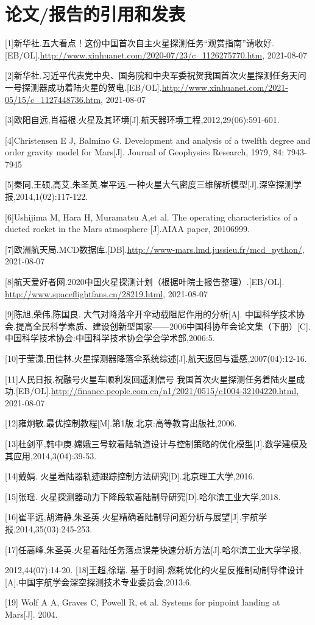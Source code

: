 \documentclass[UTF8,12pt]{ctexart}
\begin{document}
\section{论文/报告的引用和发表}
	\begin{flushleft}
		\fontsize{10.0pt}{0}
		[1]\enspace 新华社.五大看点！这份中国首次自主火星探测任务“观赏指南”请收好.[EB/OL].\url{http://www.xinhuanet.com/2020-07/23/c_1126275770.htm}, 2021-08-07
		
		[2]\enspace 新华社.习近平代表党中央、国务院和中央军委祝贺我国首次火星探测任务天问一号探测器成功着陆火星的贺电.[EB/OL].\url{http://www.xinhuanet.com/2021-05/15/c\_1127448736.htm}, 2021-08-07
		
		[3]\enspace 欧阳自远,肖福根.火星及其环境[J].航天器环境工程,2012,29(06):591-601.
		
		[4]\enspace Christensen E J, Balmino G. Development and analysis of a twelfth degree and order gravity model for Mars[J]. Journal of Geophysics Research, 1979, 84: 7943-7945
		
		[5]\enspace 秦同,王硕,高艾,朱圣英,崔平远.一种火星大气密度三维解析模型[J].深空探测学报,2014,1(02):117-122.
		
		[6]\enspace Ushijima M,  Hara H,  Muramatsu A,et al. The operating characteristics of a ducted rocket in the Mars atmosphere [J].AIAA paper, 20106999.
		
		[7]\enspace 欧洲航天局.MCD数据库.[DB].\url{http://www-mars.lmd.jussieu.fr/mcd_python/}, 2021-08-07
		
		[8]\enspace 航天爱好者网.2020中国火星探测计划（根据叶院士报告整理）.[EB/OL]. \url{http://www.spaceflightfans.cn/28219.html}, 2021-08-07
		
		[9]\enspace 陈旭,荣伟,陈国良. 大气对降落伞开伞动载阻尼作用的分析[A]. 中国科学技术协会.提高全民科学素质、建设创新型国家——2006中国科协年会论文集（下册）[C].中国科学技术协会:中国科学技术协会学会学术部,2006:5.
		
		[10]于莹潇,田佳林.火星探测器降落伞系统综述[J].航天返回与遥感,2007(04):12-16.
		
		[11]人民日报.祝融号火星车顺利发回遥测信号 我国首次火星探测任务着陆火星成功.[EB/OL].\url{http://finance.people.com.cn/n1/2021/0515/c1004-32104220.html}, 2021-08-07
		
		[12]雍炯敏.最优控制教程[M].第1版.北京:高等教育出版社,2006.
		
		[13]杜剑平,韩中庚.嫦娥三号软着陆轨道设计与控制策略的优化模型[J].数学建模及其应用,2014,3(04):39-53.
		
		[14]戴娟. 火星着陆器轨迹跟踪控制方法研究[D].北京理工大学,2016.

		[15]张瑶. 火星探测器动力下降段软着陆制导研究[D].哈尔滨工业大学,2018.
	
		[16]崔平远,胡海静,朱圣英.火星精确着陆制导问题分析与展望[J].宇航学报,2014,35(03):245-253.
	
		[17]任高峰,朱圣英.火星着陆任务落点误差快速分析方法[J].哈尔滨工业大学学报,
		
		2012,44(07):14-20.
		[18]王超,徐瑞. 基于时间-燃耗优化的火星反推制动制导律设计[A].中国宇航学会深空探测技术专业委员会,2013:6.
		
		[19] Wolf A A, Graves C, Powell R, et al. Systems for pinpoint landing at Mars[J]. 2004.
	
	\end{flushleft}
	\newpage
\end{document}
